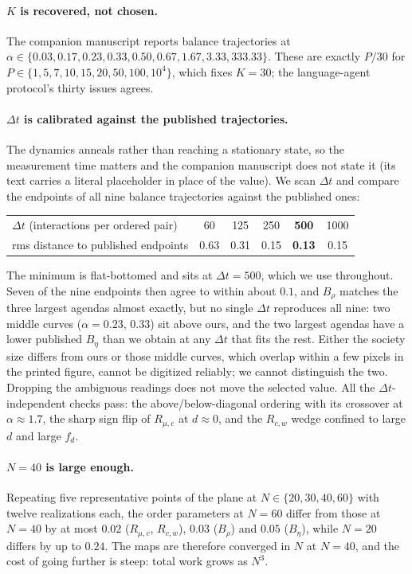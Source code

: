 \documentclass{article}
\newcommand{\Rmuc}{R_{\mu,c}}
\newcommand{\Rcw}{R_{c,w}}
\newcommand{\Brho}{B_{\rho}}
\newcommand{\Beta}{B_{\eta}}
\newcommand{\fd}{f_{d}}
\begin{document}
\paragraph{$K$ is recovered, not chosen.} The companion manuscript reports
balance trajectories at
$\alpha \in \{0.03, 0.17, 0.23, 0.33, 0.50, 0.67, 1.67, 3.33, 333.33\}$. These are
exactly $P/30$ for $P\in\{1,5,7,10,15,20,50,100,10^{4}\}$, which fixes $K=30$;
the language-agent protocol's thirty issues agrees.

\paragraph{$\Delta t$ is calibrated against the published trajectories.} The
dynamics anneals rather than reaching a stationary state, so the measurement time
matters and the companion manuscript does not state it (its text carries a
literal placeholder in place of the value). We scan $\Delta t$ and compare the
endpoints of all nine balance trajectories against the published ones:

\begin{table}[h]
\centering\small
\begin{tabular}{lccccc}
\toprule
$\Delta t$ (interactions per ordered pair) & 60 & 125 & 250 & \textbf{500} & 1000 \\
rms distance to published endpoints & 0.63 & 0.31 & 0.15 & \textbf{0.13} & 0.15 \\
\bottomrule
\end{tabular}
\end{table}

The minimum is flat-bottomed and sits at $\Delta t=500$, which we use throughout.
Seven of the nine endpoints then agree to within about $0.1$, and $\Brho$ matches
the three largest agendas almost exactly, but no single $\Delta t$ reproduces all
nine: two middle curves ($\alpha=0.23$, $0.33$) sit above ours, and the two
largest agendas have a lower published $\Beta$ than we obtain at any $\Delta t$ that
fits the rest. Either the society size differs from ours or those middle curves,
which overlap within a few pixels in the printed figure, cannot be digitized
reliably; we cannot distinguish the two. Dropping the ambiguous readings does not
move the selected value. All the $\Delta t$-independent checks pass: the
above/below-diagonal ordering with its crossover at $\alpha\approx1.7$, the sharp
sign flip of $\Rmuc$ at $d\approx0$, and the $\Rcw$ wedge confined to large $d$
and large $\fd$.

\paragraph{$N=40$ is large enough.} Repeating five representative points of the
plane at $N\in\{20,30,40,60\}$ with twelve realizations each, the order parameters
at $N=60$ differ from those at $N=40$ by at most $0.02$ ($\Rmuc$, $\Rcw$), $0.03$
($\Brho$) and $0.05$ ($\Beta$), while $N=20$ differs by up to $0.24$. The maps are
therefore converged in $N$ at $N=40$, and the cost of going further is steep: total
work grows as $N^{3}$.
\end{document}
